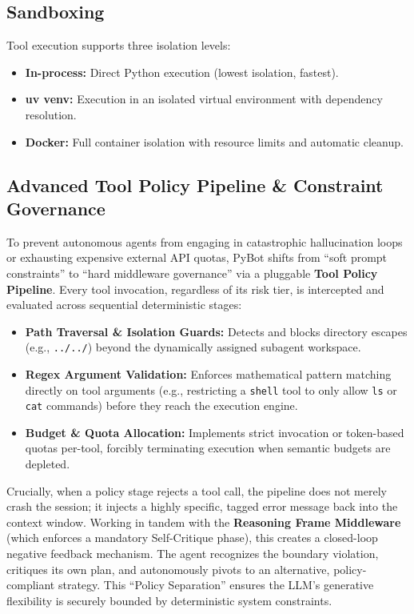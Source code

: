 \documentclass[11pt,a4paper]{article}
\begin{document}
\subsection{Sandboxing}

Tool execution supports three isolation levels:
\begin{itemize}
  \item \textbf{In-process:} Direct Python execution (lowest isolation, fastest).
  \item \textbf{uv venv:} Execution in an isolated virtual environment with dependency resolution.
  \item \textbf{Docker:} Full container isolation with resource limits and automatic cleanup.
\end{itemize}

\subsection{Advanced Tool Policy Pipeline \& Constraint Governance}

To prevent autonomous agents from engaging in catastrophic hallucination loops or exhausting expensive external API quotas, PyBot shifts from ``soft prompt constraints'' to ``hard middleware governance'' via a pluggable \textbf{Tool Policy Pipeline}. Every tool invocation, regardless of its risk tier, is intercepted and evaluated across sequential deterministic stages:
\begin{itemize}
  \item \textbf{Path Traversal \& Isolation Guards:} Detects and blocks directory escapes (e.g., \texttt{../../}) beyond the dynamically assigned subagent workspace.
  \item \textbf{Regex Argument Validation:} Enforces mathematical pattern matching directly on tool arguments (e.g., restricting a \texttt{shell} tool to only allow \texttt{ls} or \texttt{cat} commands) before they reach the execution engine.
  \item \textbf{Budget \& Quota Allocation:} Implements strict invocation or token-based quotas per-tool, forcibly terminating execution when semantic budgets are depleted.
\end{itemize}
Crucially, when a policy stage rejects a tool call, the pipeline does not merely crash the session; it injects a highly specific, tagged error message back into the context window. Working in tandem with the \textbf{Reasoning Frame Middleware} (which enforces a mandatory Self-Critique phase), this creates a closed-loop negative feedback mechanism. The agent recognizes the boundary violation, critiques its own plan, and autonomously pivots to an alternative, policy-compliant strategy. This ``Policy Separation'' ensures the LLM's generative flexibility is securely bounded by deterministic system constraints.
\end{document}
